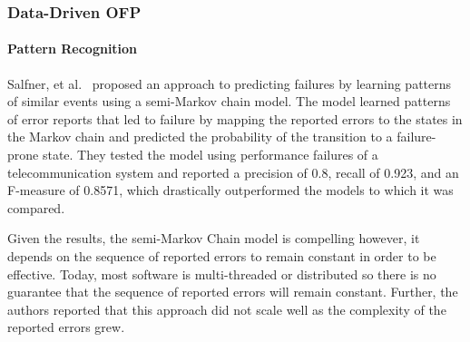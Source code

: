 \subsubsection{Data-Driven \ac{OFP}}

\paragraph{Pattern Recognition}
Salfner, et al.~\cite{salfner2006} proposed an approach to predicting failures
by learning patterns of similar events using a semi-Markov chain model.
The model learned patterns of error reports that led to failure by mapping the
reported errors to the states in the Markov chain and predicted the probability
of the transition to a failure-prone state.  They tested the model using
performance failures of a telecommunication system and reported a precision of
0.8, recall of 0.923, and an F-measure of 0.8571, which drastically
outperformed the models to which it was compared.

Given the results, the semi-Markov Chain model is compelling however, it
depends on the sequence of reported errors to remain constant in order to be
effective.  Today, most software is multi-threaded or distributed so there is
no guarantee that the sequence of reported errors will remain constant.
Further, the authors reported that this approach did not scale well as the
complexity of the reported errors grew.

